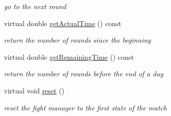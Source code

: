 \begin{DoxyCompactItemize}
\begin{DoxyCompactList}\small\item\em go to the next round \end{DoxyCompactList}\item 
virtual double \hyperlink{class_fight_manager_a73e564643e056c3ab66516e78a5ae899}{get\+Actual\+Time} () const \hypertarget{class_fight_manager_a73e564643e056c3ab66516e78a5ae899}{}\label{class_fight_manager_a73e564643e056c3ab66516e78a5ae899}

\begin{DoxyCompactList}\small\item\em return the number of rounds since the beginning \end{DoxyCompactList}\item 
virtual double \hyperlink{class_fight_manager_ae33ba3d6171ee2caea9f0cc87f4e1d63}{get\+Remaining\+Time} () const \hypertarget{class_fight_manager_ae33ba3d6171ee2caea9f0cc87f4e1d63}{}\label{class_fight_manager_ae33ba3d6171ee2caea9f0cc87f4e1d63}

\begin{DoxyCompactList}\small\item\em return the number of rounds before the end of a day \end{DoxyCompactList}\item 
virtual void \hyperlink{class_fight_manager_a339f74a74fc4b229bec63bf968cc2f3b}{reset} ()\hypertarget{class_fight_manager_a339f74a74fc4b229bec63bf968cc2f3b}{}\label{class_fight_manager_a339f74a74fc4b229bec63bf968cc2f3b}

\begin{DoxyCompactList}\small\item\em reset the fight manager to the first state of the match \end{DoxyCompactList}\end{DoxyCompactItemize}
